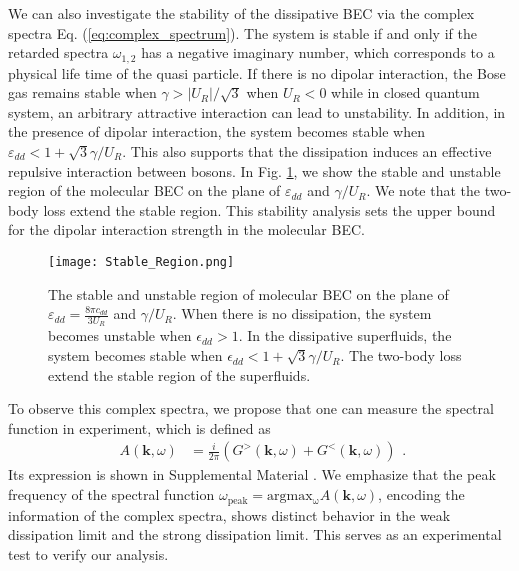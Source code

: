 \documentclass[aps,prl,twocolumn,superscriptaddress,]{revtex4-1}
\begin{document}
We can also investigate the stability of the dissipative BEC via the complex spectra Eq. (\ref{eq:complex_spectrum}). The system is stable if and only if the retarded spectra $\omega_{1,2}$ has a negative imaginary number, which corresponds to a physical life time of the quasi particle. If there is no dipolar interaction, the Bose gas remains stable when $\gamma>|U_R|/\sqrt{3}$ when $U_R<0$ \cite{Ce2022} while in closed quantum system, an arbitrary attractive interaction can lead to unstability. In addition, in the presence of dipolar interaction, the system becomes stable when $\varepsilon_{dd}<1+\sqrt{3}\gamma/U_R$. This also supports that the dissipation induces an effective repulsive interaction between bosons. In Fig. \ref{fig:stable}, we show the stable and unstable region of the molecular BEC on the plane of $\varepsilon_{dd}$ and $\gamma/U_R$. We note that the two-body loss extend the stable region. This stability analysis sets the upper bound for the dipolar interaction strength in the molecular BEC. 
\begin{figure}
    \texttt{[image: Stable\_Region.png]}
    
    \caption{The stable and unstable region of molecular BEC on the plane of $\varepsilon_{dd}=\frac{8\pi c_{dd}}{3U_R}$ and $\gamma/U_R$. When there is no dissipation, the system becomes unstable when $\epsilon_{dd}>1$. In the dissipative superfluids, the system becomes stable when $\epsilon_{dd}<1+\sqrt{3}\gamma/U_R$. The two-body loss extend the stable region of the superfluids. }
    
       \label{fig:stable}
\end{figure}


To observe this complex spectra, we propose that one can measure the spectral function in experiment, which is defined as 
\begin{equation}
	\begin{aligned}A(\bm{k},\omega) & =\frac{i}{2\pi}(G^{>}(\bm{k},\omega)+G^{<}(\bm{k},\omega))\end{aligned}
	.\label{eq:spectrum_function}
\end{equation}
Its expression is shown in Supplemental Material \cite{SupplementaryMaterial}. We emphasize that the peak frequency of the spectral function $\omega_{\mathrm{peak}}=\mathrm{argmax_\omega}A(\bm{k},\omega)$, encoding the information of the complex spectra, shows distinct behavior in the weak dissipation limit and the strong dissipation limit. This serves as an experimental test to verify our analysis.
\end{document}
